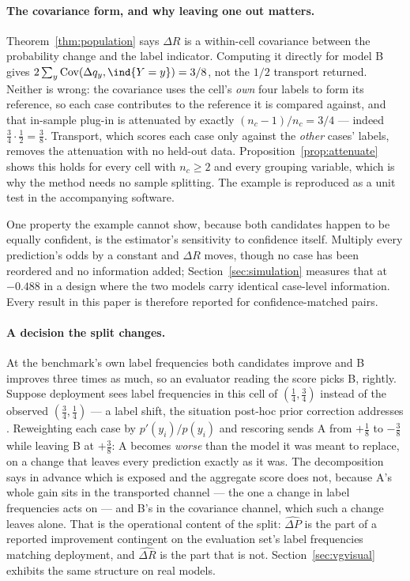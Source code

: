 \paragraph{The covariance form, and why leaving one out matters.}
Theorem~\ref{thm:population} says $\Delta R$ is a within-cell covariance between the
probability change and the label indicator. Computing it directly for model B gives
$2\sum_y\operatorname{Cov}(\Delta q_y,\ind\{Y=y\})=3/8$, not the $1/2$ transport returned.
Neither is wrong: the covariance uses the cell's \emph{own} four labels to form its
reference, so each case contributes to the reference it is compared against, and that
in-sample plug-in is attenuated by exactly $(n_c-1)/n_c=3/4$ --- indeed
$\tfrac34\cdot\tfrac12=\tfrac38$. Transport, which scores each case only against the
\emph{other} cases' labels, removes the attenuation with no held-out data.
Proposition~\ref{prop:attenuate} shows this holds for every cell with $n_c\ge2$ and every
grouping variable, which is why the method needs no sample splitting. The example is
reproduced as a unit test in the accompanying software.

One property the example cannot show, because both candidates happen to be equally
confident, is the estimator's sensitivity to confidence itself. Multiply every prediction's
odds by a constant and $\Delta R$ moves, though no case has been reordered and no
information added; Section~\ref{sec:simulation} measures that at $-0.488$ in a design where
the two models carry identical case-level information. Every result in this paper is
therefore reported for confidence-matched pairs.

\paragraph{A decision the split changes.}\label{sec:decision}
At the benchmark's own label frequencies both candidates improve and B improves three times
as much, so an evaluator reading the score picks B, rightly. Suppose deployment sees label
frequencies in this cell of $(\tfrac14,\tfrac34)$ instead of the observed
$(\tfrac34,\tfrac14)$ --- a label shift, the situation post-hoc prior correction addresses
\citep{saerens2002adjusting,lipton2018detecting}. Reweighting each case by $p'(y_i)/p(y_i)$
and rescoring sends A from $+\tfrac18$ to $-\tfrac38$ while leaving B at $+\tfrac38$: A
becomes \emph{worse} than the model it was meant to replace, on a change that leaves every
prediction exactly as it was. The decomposition says in advance which is exposed and the
aggregate score does not, because A's whole gain sits in the transported channel --- the one
a change in label frequencies acts on --- and B's in the covariance channel, which such a
change leaves alone. That is the operational content of the split: $\widehat{\Delta P}$ is
the part of a reported improvement contingent on the evaluation set's label frequencies
matching deployment, and $\widehat{\Delta R}$ is the part that is not.
Section~\ref{sec:vgvisual} exhibits the same structure on real models.
